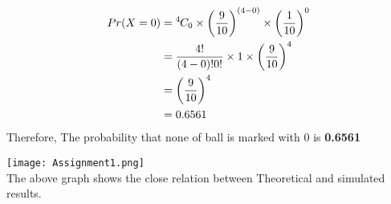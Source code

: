 \documentclass[a4paper]{article}
\newcommand*{\permcomb}[4][0mu]{{{}^{#3}\mkern#1#2_{#4}}}
\newcommand*{\comb}[1][-1mu]{\permcomb[#1]{C}}
\begin{document}
\begin{multicols*}{2}
\begin{align}
Pr(X=0) &= \comb{4}{0} \times \bigg(\frac{9}{10}\bigg)^{(4-0)} \times \bigg(\frac{1}{10}\bigg)^{0} \\
&=\frac{4!}{(4-0)! 0!} \times 1 \times \bigg(\frac{9}{10}\bigg)^{4} \\
&=\bigg( \frac{9}{10}\bigg) ^{4} \\
&= 0.6561
\end{align}
Therefore, The probability that none of ball is marked with $0$ is \textbf{0.6561}

\texttt{[image: Assignment1.png]}\\
 The above graph shows the close relation between Theoretical and simulated results.

\end{multicols*}
\end{document}
